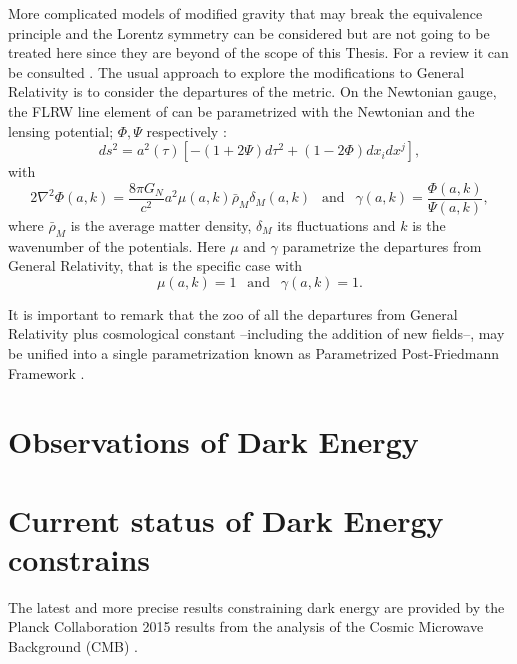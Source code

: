 More complicated models of modified gravity that may break the equivalence principle and the Lorentz symmetry can be considered but are not going to be treated here since they are beyond of the scope of this Thesis. For a review it can be consulted \cite{2015CQGra..32x3001B}. The usual approach to explore the modifications to General Relativity \cite{2015PhRvD..91h3504L} is to consider the departures of the metric. On the Newtonian gauge, the FLRW line element of can be parametrized with the Newtonian and the lensing potential; $\Phi,\Psi$ respectively \cite{2015PhRvD..91h3504L}:
\begin{equation}
ds^2 = a^2(\tau)[-(1+2\Psi)d\tau^2+(1-2\Phi)dx_idx^j],
\end{equation}
with
\begin{equation}
2\nabla^2\Phi(a,k) = \frac{8\pi G_N}{c^2}a^2\mu(a,k)\bar \rho_M\delta_M(a,k)\ \ \mbox{ and }\ \ \gamma(a,k)=\frac{\Phi(a,k)}{\Psi(a,k)},
\end{equation}
where $\bar \rho_M$ is the average matter density, $\delta_M$ its fluctuations and $k$ is the wavenumber of the potentials. Here $\mu$ and $\gamma$ parametrize the departures from General Relativity, that is the specific case with
\begin{equation}
\mu(a,k) = 1\ \ \mbox{ and }\ \ \gamma(a,k) = 1.
\end{equation}

It is important to remark that the zoo of all the departures from General Relativity plus cosmological constant --including the addition of new fields--, may be unified into a single parametrization known as Parametrized Post-Friedmann Framework \cite{2013PhRvD..87b4015B}.

\section{Observations of Dark Energy}

\section{Current status of Dark Energy constrains}
The latest and more precise results constraining dark energy are provided by the Planck Collaboration 2015 results from the analysis of the Cosmic Microwave Background (CMB) \cite{2016A&A...594A..14P}.
\newline

